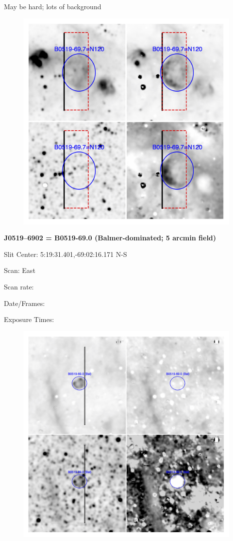 \documentclass[11pt]{article}
\begin{document}
May be hard; lots of background
\begin{figure}
\includegraphics[width=12.5cm]{snapshots/N120_5arcmin.png}
\end{figure}

\newpage
{\bf J0519--6902 = B0519-69.0 (Balmer-dominated; 5 arcmin field)}  
 
Slit Center:   5:19:31.401,-69:02:16.171 N-S

Scan:  East

Scan rate:  

Date/Frames:

Exposure Times:  

\begin{figure}
\includegraphics[width=11.cm]{snapshots/B0519-690_5arcmin.png}
\end{figure}
\end{document}
